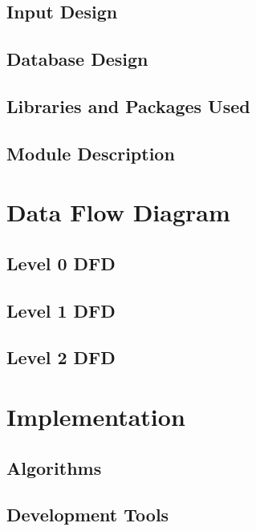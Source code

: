 \documentclass[11pt]{report}
\begin{document}
\section{Input Design}
\section{Database Design}
\section{Libraries and Packages Used}
\section{Module Description}

\chapter{Data Flow Diagram}
\section{Level 0 DFD}
\section{Level 1 DFD}
\section{Level 2 DFD}

\chapter{Implementation}
\section{Algorithms}
\section{Development Tools}
\end{document}
